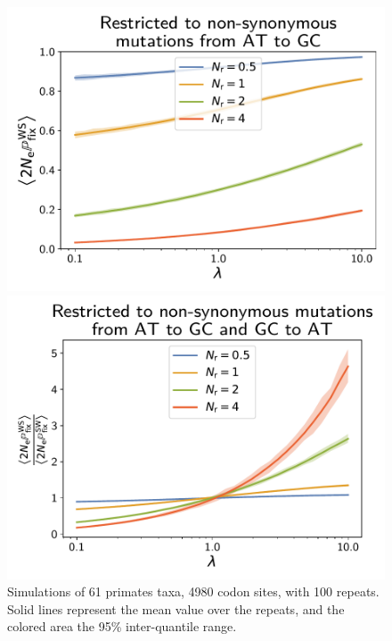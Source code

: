 \documentclass{article}
\begin{document}
\begin{figure}[h]
\begin{minipage}{0.32\linewidth}
 \includegraphics[width=\linewidth, page=1]{simulations/omega_WS}
 \end{minipage}
 \hfill
 \begin{minipage}{0.32\linewidth}
 \includegraphics[width=\linewidth, page=1]{simulations/omega_WS_over_SW}
 \end{minipage}
 \hfill
 \caption[$\atgc$ composition of the alignment]{
  Simulations of 61 primates taxa, 4980 codon sites, with 100 repeats.
Solid lines represent the mean value over the repeats, and the colored area the 95\% inter-quantile range.
}
\end{figure}
\end{document}
